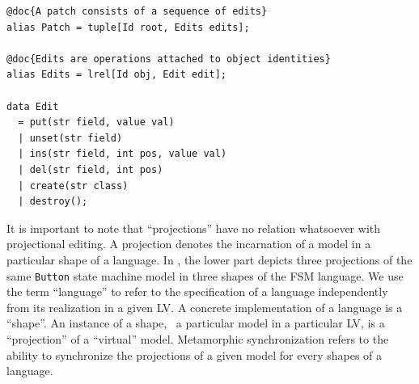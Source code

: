 
\begin{lstlisting}[label=lst:delta-adt, caption={CRUD-like patch definition in Rascal}, language=Rascal, float=tb]
@doc{A patch consists of a sequence of edits}
alias Patch = tuple[Id root, Edits edits];

@doc{Edits are operations attached to object identities}
alias Edits = lrel[Id obj, Edit edit];

data Edit
  = put(str field, value val)
  | unset(str field)
  | ins(str field, int pos, value val)
  | del(str field, int pos)
  | create(str class) 
  | destroy();
\end{lstlisting}

It is important to note that ``projections'' have no relation whatsoever with projectional editing.
A projection denotes the incarnation of a model in a particular shape of a language.
In , the lower part depicts three projections of the same \texttt{Button} state machine model in three shapes of the FSM language.
We use the term ``language'' to refer to the specification of a language independently from its realization in a given LV.
A concrete implementation of a language is a ``shape''.
An instance of a shape, \ie~a particular model in a particular LV, is a ``projection'' of a ``virtual'' model.
Metamorphic synchronization refers to the ability to synchronize the projections of a given model for every shapes of a language.
